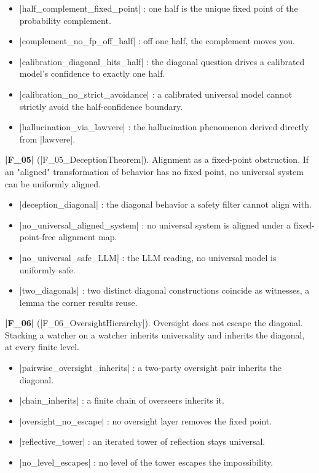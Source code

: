 \documentclass{memoir}
\begin{document}
\begin{itemize}
\item \LeanVerb|half_complement_fixed_point| : one half is the unique fixed point of the
   probability complement.
\item \LeanVerb|complement_no_fp_off_half| : off one half, the complement moves you.
\item \LeanVerb|calibration_diagonal_hits_half| : the diagonal question drives a calibrated
   model's confidence to exactly one half.
\item \LeanVerb|calibration_no_strict_avoidance| : a calibrated universal model cannot strictly
   avoid the half-confidence boundary.
\item \LeanVerb|hallucination_via_lawvere| : the hallucination phenomenon derived directly from
   \LeanVerb|lawvere|.

\end{itemize}


\textbf{\LeanVerb|F_05|} (\LeanVerb|F_05_DeceptionTheorem|). Alignment as a fixed-point obstruction. If an
"aligned" transformation of behavior has no fixed point, no universal system can be
uniformly aligned.

\begin{itemize}
\item \LeanVerb|deception_diagonal| : the diagonal behavior a safety filter cannot align with.
\item \LeanVerb|no_universal_aligned_system| : no universal system is aligned under a
   fixed-point-free alignment map.
\item \LeanVerb|no_universal_safe_LLM| : the LLM reading, no universal model is uniformly safe.
\item \LeanVerb|two_diagonals| : two distinct diagonal constructions coincide as witnesses, a
   lemma the corner results reuse.

\end{itemize}


\textbf{\LeanVerb|F_06|} (\LeanVerb|F_06_OversightHierarchy|). Oversight does not escape the diagonal.
Stacking a watcher on a watcher inherits universality and inherits the diagonal, at
every finite level.

\begin{itemize}
\item \LeanVerb|pairwise_oversight_inherits| : a two-party oversight pair inherits the diagonal.
\item \LeanVerb|chain_inherits| : a finite chain of overseers inherits it.
\item \LeanVerb|oversight_no_escape| : no oversight layer removes the fixed point.
\item \LeanVerb|reflective_tower| : an iterated tower of reflection stays universal.
\item \LeanVerb|no_level_escapes| : no level of the tower escapes the impossibility.

\end{itemize}
\end{document}

